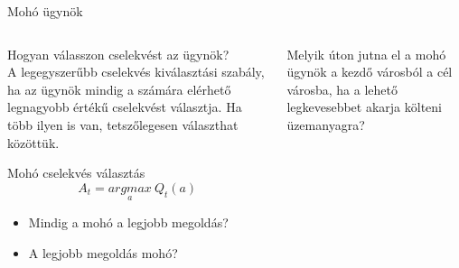 \documentclass[english, aspectratio=169]{beamer}
\begin{document}
\begin{frame}{Mohó ügynök}
\begin{columns}
\begin{column}{.5\textwidth}
Hogyan válasszon cselekvést az ügynök?\\
A legegyszerűbb cselekvés kiválasztási szabály, ha az ügynök mindig a számára elérhető legnagyobb értékű cselekvést választja. Ha több ilyen is van, tetszőlegesen választhat közöttük. 
\begin{center}
\begin{block}{Mohó cselekvés választás}
\[
A_{t}=\underset{a}{argmax}\:Q_{t}(a)
\]
\end{block}
\begin{itemize}
	\item Mindig a mohó a legjobb megoldás?
	\item A legjobb megoldás mohó?
\end{itemize}
\end{center}
\end{column}
\begin{column}{.5\textwidth}
\begin{center}
\end{center}
Melyik úton jutna el a mohó ügynök a kezdő városból a cél városba, ha a lehető legkevesebbet akarja költeni üzemanyagra?
\end{column}
\end{columns}
\end{frame}
\end{document}
